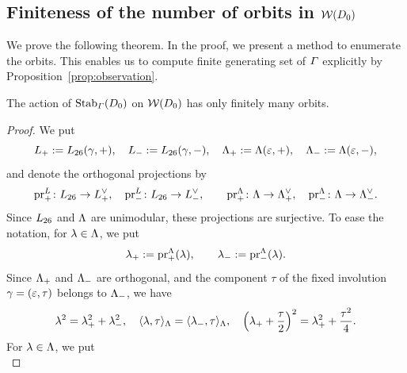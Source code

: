 \documentclass{amsart} %
\begin{document}
\subsection{Finiteness of the number of orbits in $\mathord{\mathcal{W}}(D_0)$}\label{subsec:finite}
%
We prove the following theorem.
In the proof,
we present a method to enumerate the orbits.
This enables us to compute finite generating set of $\varGamma$
explicitly by Proposition~\ref{prop:observation}.
%
\begin{theorem}
The action of $\operatorname{Stab}_{\varGamma}(D_0)$ on $\mathord{\mathcal{W}}(D_0)$ has only finitely many orbits.
\end{theorem}
%
%
\begin{proof}
We put
\[
L_{+}:=L_{26}(\gamma, +),
\quad
L_{-}:=L_{26}(\gamma,-), 
\quad
\Lambda_{+}:=\Lambda(\varepsilon, +),
\quad
\Lambda_{-}:=\Lambda(\varepsilon,-), 
\]
and denote the orthogonal projections by
%
\[
\operatorname{pr}^{L}_{+} \colon L_{26}\to L_{+}^{\vee}, \quad 
\operatorname{pr}^{L}_{-}\colon L_{26}\to L_{-}^{\vee}, \qquad 
\operatorname{pr}^{\Lambda}_{+}\colon \Lambda\to \Lambda_{+}^{\vee}, \quad 
\operatorname{pr}^{\Lambda}_{-}\colon\Lambda\to \Lambda_{-}^{\vee}.
\]
%
%
Since $L_{26}$ and $\Lambda$ are unimodular, 
these projections are surjective.
%
%
%
To ease the notation, for $\lambda\in \Lambda$, 
we put
\[
{\lambda}_{+}:=\operatorname{pr}^{\Lambda}_{+}(\lambda),
\qquad 
{\lambda}_{-}:=\operatorname{pr}^{\Lambda}_{-}(\lambda).
\]
Since $\Lambda_{+}$ and $ \Lambda_{-}$ are orthogonal, and 
the component $\tau$ of 
the fixed involution $\gamma=(\varepsilon, \tau)$ belongs to $ \Lambda_{-}$, 
we have 
\[
\lambda^2={\lambda}_{+}^2+{\lambda}_{-}^2,
\quad
\langle \lambda, \tau \rangle_{\Lambda}=\langle {\lambda}_{-}, \tau \rangle_{\Lambda}, 
\quad
\left({\lambda}_{+} +\frac{\tau}{2} \right)^2={\lambda}_{+}^2+\frac{\tau^2}{4}.
\]
For $\lambda\in \Lambda$, we put
%
%
\begin{equation}\label{eq:defmlambda}

\end{equation}
\end{proof}
\end{document}
